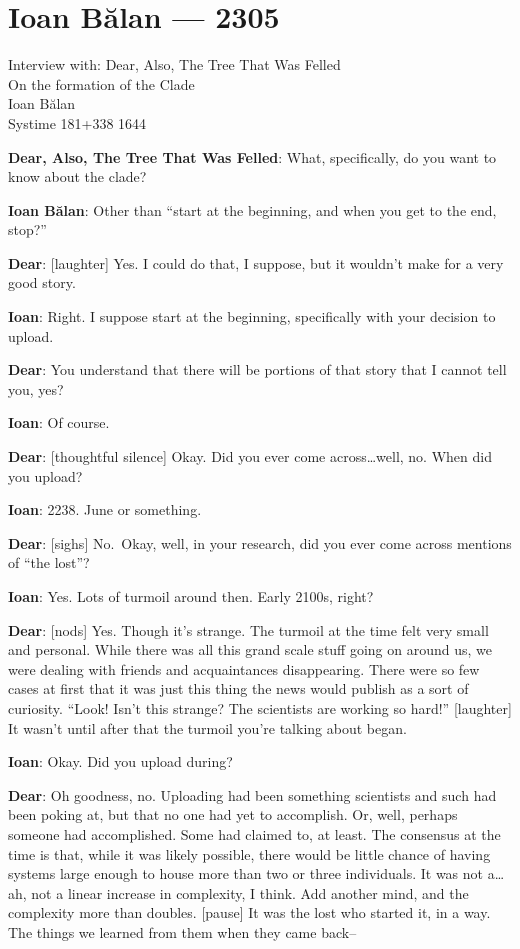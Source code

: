 \hypertarget{ioan-bux103lan-2305}{%
\chapter*{Ioan Bălan — 2305}\label{ioan-bux103lan-2305}}

Interview with: Dear, Also, The Tree That Was Felled\\
On the formation of the Clade\\
Ioan Bălan\\
Systime 181+338 1644

\textbf{Dear, Also, The Tree That Was Felled}: What, specifically, do you want to know about the clade?

\textbf{Ioan Bălan}: Other than ``start at the beginning, and when you get to the end, stop?''

\textbf{Dear}: {[}laughter{]} Yes. I could do that, I suppose, but it wouldn't make for a very good story.

\textbf{Ioan}: Right. I suppose start at the beginning, specifically with your decision to upload.

\textbf{Dear}: You understand that there will be portions of that story that I cannot tell you, yes?

\textbf{Ioan}: Of course.

\textbf{Dear}: {[}thoughtful silence{]} Okay. Did you ever come across\ldots{}well, no. When did you upload?

\textbf{Ioan}: 2238. June or something.

\textbf{Dear}: {[}sighs{]} No.~Okay, well, in your research, did you ever come across mentions of ``the lost''?

\textbf{Ioan}: Yes. Lots of turmoil around then. Early 2100s, right?

\textbf{Dear}: {[}nods{]} Yes. Though it's strange. The turmoil at the time felt very small and personal. While there was all this grand scale stuff going on around us, we were dealing with friends and acquaintances disappearing. There were so few cases at first that it was just this thing the news would publish as a sort of curiosity. ``Look! Isn't this strange? The scientists are working so hard!'' {[}laughter{]} It wasn't until after that the turmoil you're talking about began.

\textbf{Ioan}: Okay. Did you upload during?

\textbf{Dear}: Oh goodness, no. Uploading had been something scientists and such had been poking at, but that no one had yet to accomplish. Or, well, perhaps someone had accomplished. Some had claimed to, at least. The consensus at the time is that, while it was likely possible, there would be little chance of having systems large enough to house more than two or three individuals. It was not a\ldots{}ah, not a linear increase in complexity, I think. Add another mind, and the complexity more than doubles. {[}pause{]} It was the lost who started it, in a way. The things we learned from them when they came back--

